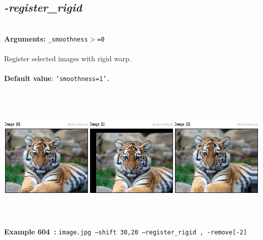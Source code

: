 \documentclass[a4paper,11pt,twoside]{book}
\begin{document}
\subsection{\emph{-register\_rigid} }\vspace*{-0.5em}
~\\\textbf{Arguments: } 
{\small \texttt{\_smoothness$>$=0}}\\~\\
Register selected images with rigid warp.
~\\~\\\textbf{Default value}: {\small \texttt{'smoothness=1'.}}
\begin{center}\includegraphics[keepaspectratio=true,height=7cm,width=\textwidth]{img/gmic_def604.jpg}\\
{\footnotesize \textbf{Example 604~:} \texttt{image.jpg --shift 30,20 --register\_rigid , -remove[-2]}}
\end{center}
\end{document}
